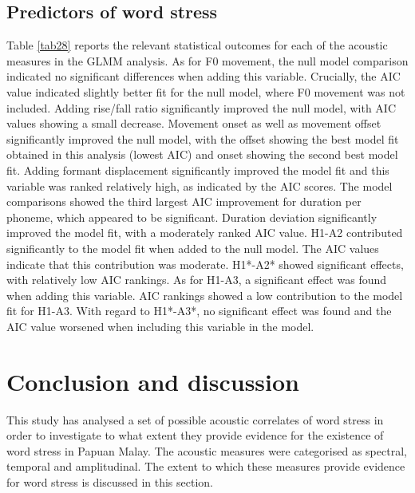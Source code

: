 \newpage

\subsection{Predictors of word stress}
Table \ref{tab28} reports the relevant statistical outcomes for each of the acoustic measures in the GLMM analysis. As for F0 movement, the null model comparison indicated no significant differences when adding this variable. Crucially, the AIC value indicated slightly better fit for the null model, where F0 movement was not included. Adding rise/fall ratio significantly improved the null model, with AIC values showing a small decrease. Movement onset as well as movement offset significantly improved the null model, with the offset showing the best model fit obtained in this analysis (lowest AIC) and onset showing the second best model fit. Adding formant displacement significantly improved the model fit and this variable was ranked relatively high, as indicated by the AIC scores. The model comparisons showed the third largest AIC improvement for duration per phoneme, which appeared to be significant. Duration deviation significantly improved the model fit, with a moderately ranked AIC value. H1-A2 contributed significantly to the model fit when added to the null model. The AIC values indicate that this contribution was moderate. H1*-A2* showed significant effects, with relatively low AIC rankings. As for H1-A3, a significant effect was found when adding this variable. AIC rankings showed a low contribution to the model fit for H1-A3. With regard to H1*-A3*, no significant effect was found and the AIC value worsened when including this variable in the model.

\section{Conclusion and discussion}
This study has analysed a set of possible acoustic correlates of word stress in order to investigate to what extent they provide evidence for the existence of word stress in Papuan Malay. The acoustic measures were categorised as spectral, temporal and amplitudinal. The extent to which these measures provide evidence for word stress is discussed in this section.

